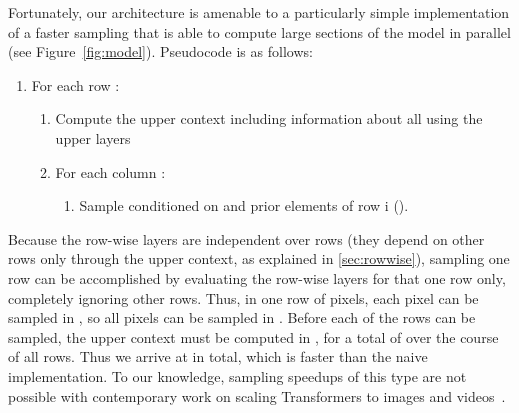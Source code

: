 \documentclass{article} \usepackage{iclr2020_conference,times}
\begin{document}
Fortunately, our architecture is amenable to a particularly simple implementation of a faster sampling that is able to compute large sections of the model in parallel (see Figure~\ref{fig:model}). Pseudocode is as follows:
\begin{enumerate}
    \item For each row :
    \begin{enumerate}
        \item Compute the upper context  including information about all  using the upper layers
        \item For each column :
        \begin{enumerate}
            \item Sample  conditioned on  and prior elements of row i ().
\end{enumerate}
    \end{enumerate}
\end{enumerate}
Because the  row-wise layers are independent over rows (they depend on other rows only through the upper context, as explained in \cref{sec:rowwise}), sampling one row can be accomplished by evaluating the row-wise layers for that one row only, completely ignoring other rows. Thus, in one row of  pixels, each pixel can be sampled in , so all pixels can be sampled in . Before each of the  rows can be sampled, the upper context must be computed in , for a total of   over the course of all rows. Thus we arrive at  in total, which is  faster than the naive implementation. To our knowledge, sampling speedups of this type are not possible with contemporary work on scaling Transformers to images and videos~\citep{child2019generating,weissenborn2019scaling}.
\end{document}
